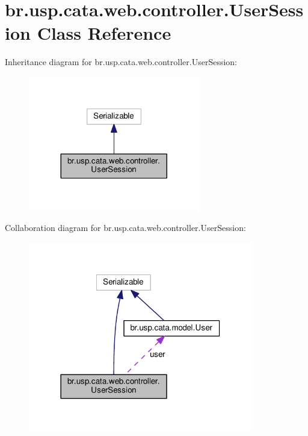 \hypertarget{classbr_1_1usp_1_1cata_1_1web_1_1controller_1_1_user_session}{\section{br.\+usp.\+cata.\+web.\+controller.\+User\+Session Class Reference}
\label{classbr_1_1usp_1_1cata_1_1web_1_1controller_1_1_user_session}
}


Inheritance diagram for br.\+usp.\+cata.\+web.\+controller.\+User\+Session\+:\nopagebreak
\begin{figure}[H]
\begin{center}
\leavevmode
\includegraphics[width=212pt]{classbr_1_1usp_1_1cata_1_1web_1_1controller_1_1_user_session__inherit__graph}
\end{center}
\end{figure}


Collaboration diagram for br.\+usp.\+cata.\+web.\+controller.\+User\+Session\+:\nopagebreak
\begin{figure}[H]
\begin{center}
\leavevmode
\includegraphics[width=278pt]{classbr_1_1usp_1_1cata_1_1web_1_1controller_1_1_user_session__coll__graph}
\end{center}
\end{figure}
